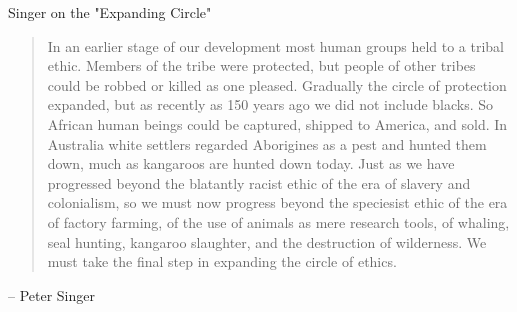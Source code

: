 \documentclass[aspectratio=169]{beamer}
\begin{document}
\begin{frame}{Singer on the "Expanding Circle"}
\begin{quote}
    In an earlier stage of our development most human groups held to a tribal ethic. Members of the tribe were protected, but people of other tribes could be robbed or killed as one pleased. Gradually the circle of protection expanded, but as recently as 150 years ago we did not include blacks. So African human beings could be captured, shipped to America, and sold. In Australia white settlers regarded Aborigines as a pest and hunted them down, much as kangaroos are hunted down today. Just as we have progressed beyond the blatantly racist ethic of the era of slavery and colonialism, so we must now progress beyond the speciesist ethic of the era of factory farming, of the use of animals as mere research tools, of whaling, seal hunting, kangaroo slaughter, and the destruction of wilderness. We must take the final step in expanding the circle of ethics.
\end{quote}
-- Peter Singer
\end{frame}
\end{document}
